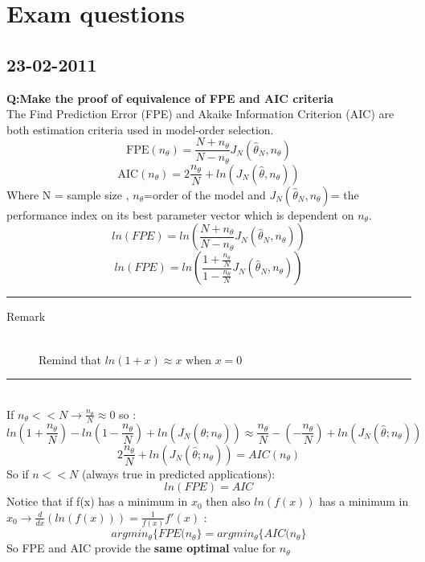 \documentclass[12pt]{article} %
\begin{document}

\tableofcontents %

\newpage %

\section{Exam questions}
\subsection{23-02-2011}
\textbf{Q:Make the proof of equivalence of FPE and AIC criteria
}\vspace{2mm}\\The Find Prediction Error (FPE) and Akaike Information Criterion (AIC) are both estimation criteria used in model-order selection.
$$ \text{FPE}(n_{\theta})= \frac{N+n_{\theta}}{N-n_{\theta}} J_N(\hat{\theta}_N,n_{\theta})$$
$$ \text{AIC}(n_\theta) = 2 \frac{n_{\theta}}{N}+ ln(J_N(\hat{\theta},n_{\theta})) $$
Where N = sample size , $n_{\theta}$=order of the model and $J_N(\hat{\theta}_N,n_{\theta})$= the performance index on its best parameter vector which is dependent on $n_{\theta}$.
$$ ln(FPE) = ln(\frac{N+n_{\theta}}{N-n_{\theta}} J_N(\hat{\theta}_N,n_{\theta}))$$
$$ ln(FPE) = ln(\frac{1+\frac{n_{\theta}}{N}}{1-\frac{n_{\theta}}{N}} J_N(\hat{\theta}_N,n_{\theta}))$$
\par\noindent\rule{\textwidth}{0.4pt}
\begin{description}
\item[Remark]\hfill\\
Remind that $ln(1+x) \approx x \text{ when } x=0$
\end{description}
\par\noindent\rule{\textwidth}{0.4pt}
\\If $n_{\theta}<<N \to \frac{n_{\theta}}{N} \approx 0$ so :
$$ ln(1+\frac{n_{\theta}}{N}) - ln(1-\frac{n_{\theta}}{N}) + ln(J_N(\hat{\theta};n_{\theta})) \approx \frac{n_{\theta}}{N}-(-\frac{n_{\theta}}{N})+ln(J_N(\hat{\theta};n_{\theta}))$$
$$ 2\frac{n_{\theta}}{N}+ln(J_N(\hat{\theta};n_{\theta})) = AIC(n_{\theta})$$
So if $n<<N$ (always true in predicted applications):
\[
\boxed{ln(FPE) = AIC	}
\]
Notice that if f(x) has a minimum in $x_0$ then also $ln(f(x))$ has a minimum in $x_0 \to \frac{d}{dx}(ln(f(x))) = \frac{1}{f(x)}f'(x)$ :
\[
\boxed{argmin_{\theta}\{FPE(n_{\theta}\}=argmin_{\theta}\{AIC(n_{\theta}\}}
\] 
So FPE and AIC provide the \textbf{same optimal} value for $n_{\theta}$
\end{document}
